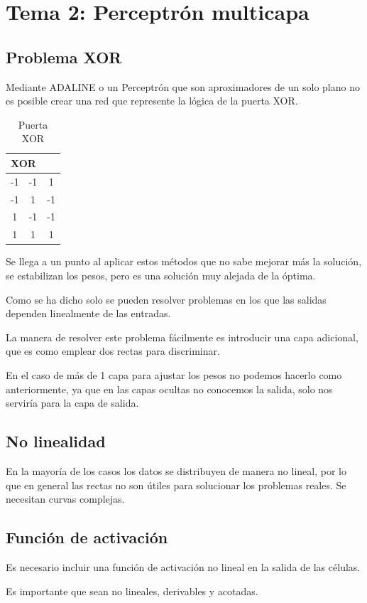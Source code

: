 \documentclass[12pt, twoside, openright]{report} %
\begin{document}
\chapter{Tema 2: Perceptrón multicapa}
\section{Problema XOR}
Mediante ADALINE o un Perceptrón que son aproximadores de un solo plano no es posible crear una red que represente la lógica de la puerta XOR.
\begin{table}[H]
	\centering
	\caption{Puerta XOR}
	\begin{tabular}{cc|c}
		\multicolumn{2}{l}{XOR} & \multicolumn{1}{l}{} \\ \hline
		-1 & -1 & 1  \\
		-1 & 1  & -1 \\
		1  & -1 & -1 \\
		1  & 1  & 1
	\end{tabular}
\end{table}

Se llega a un punto al aplicar estos métodos que no sabe mejorar más la solución, se estabilizan los pesos, pero es una solución muy alejada de la óptima.

Como se ha dicho solo se pueden resolver problemas en los que las salidas dependen linealmente de las entradas.

La manera de resolver este problema fácilmente es introducir una capa adicional, que es como emplear dos rectas para discriminar.

En el caso de más de 1 capa para ajustar los pesos no podemos hacerlo como anteriormente, ya que en las capas ocultas no conocemos la salida, solo nos serviría para la capa de salida.

\section{No linealidad}
En la mayoría de los casos los datos se distribuyen de manera no lineal, por lo que en general las rectas no son útiles para solucionar los problemas reales. Se necesitan curvas complejas.

\section{Función de activación}
Es necesario incluir una función de activación no lineal en la salida de las células. 

Es importante que sean no lineales, derivables y acotadas.
\pagebreak
\end{document}
